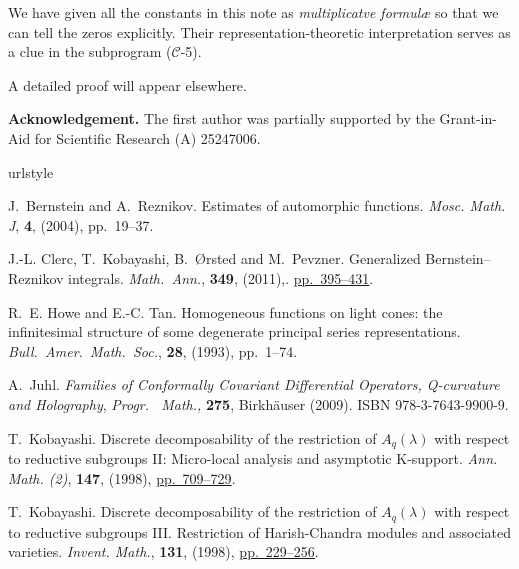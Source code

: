 \documentclass[reqno,12pt]{pja00} %
\theoremstyle{definition}
\theoremstyle{exampstyle} \newtheorem{examp}[theorem]{Theorem}
\begin{document}
We have given all the constants in this note as {\textit{multiplicatve formul\ae}}
so that we can tell the zeros explicitly. 
Their representation-theoretic interpretation serves as a clue
in the subprogram ($\mathcal C$-5).

	A detailed proof will appear elsewhere.

	{\bf Acknowledgement.} The first author was partially supported by the Grant-in-Aid for Scientific Research (A) 25247006.
\nocite{kobayashi1998discrete2}
\nocite{kobayashi2015program}
\small
\begin{thebibliography}{14}
\expandafter\ifx\csname urlstyle\endcsname\relax
  \providecommand{\doi}[1]{doi:\discretionary{}{}{}#1}\else
  \providecommand{\doi}{doi:\discretionary{}{}{}\begingroup
  \urlstyle{rm}\Url}\fi

J.~Bernstein and A.~Reznikov.
\newblock Estimates of automorphic functions.
\newblock \emph{{\normalfont Mosc. Math. J}}, \textbf{\textbf{4}}, (2004),
  pp.~19--37.

J.-L. Clerc, T.~Kobayashi, B.~{\O}rsted and M.~Pevzner.
\newblock Generalized {B}ernstein--{R}eznikov integrals.
\newblock \emph{{\normalfont Math.~Ann.}}, \textbf{349}, (2011),.
\href{http://dx.doi.org/10.1007/s00208-010-0516-4}{pp.~395--431}.

R.~E. Howe and E.-C. Tan.
\newblock Homogeneous functions on light cones: the infinitesimal structure of
  some degenerate principal series representations.
\newblock \emph{{\normalfont Bull.~Amer.~Math.~Soc.}}, \textbf{28},
  (1993), pp.~1--74.

A.~Juhl.
\newblock \emph{Families of {C}onformally {C}ovariant {D}ifferential
  {O}perators, {Q}-curvature and {H}olography}, \emph{{\normalfont Progr.~ Math.},} \textbf{275},
\newblock Birkh{\"a}user (2009).
\newblock ISBN 978-3-7643-9900-9.

T.~Kobayashi.
\newblock Discrete decomposability of the restriction of {$A_q(\lambda)$} with
  respect to reductive subgroups {II}: Micro-local analysis and asymptotic
  {K}-support.
  \newblock \emph{{\normalfont Ann. Math. (2)}}, \textbf{147}, (1998),
\href{http://dx.doi.org/10.2307/120963}{pp.~709--729}.

T.~Kobayashi.
\newblock Discrete decomposability of the restriction of {$A_q(\lambda)$} with
  respect to reductive subgroups {III}. {R}estriction of {H}arish-{C}handra
  modules and associated varieties.
\newblock \emph{{\normalfont Invent. Math.}}, \textbf{131}, (1998), 
\href{http://dx.doi.org/10.1007/s002220050203}{pp.~229--256}.


\end{thebibliography}
\end{document}
